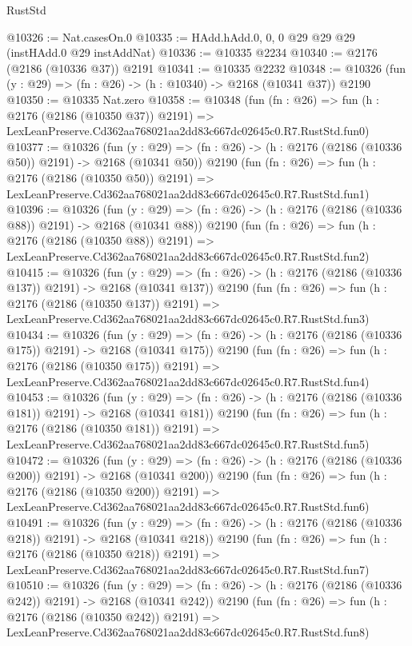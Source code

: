 \begin{lexlean}{RustStd}
\begin{coremodule}
@10326 := Nat.casesOn.{0}
@10335 := HAdd.hAdd.{0, 0, 0} @29 @29 @29 (instHAdd.{0} @29 instAddNat)
@10336 := @10335 @2234
@10340 := @2176 (@2186 (@10336 @37)) @2191
@10341 := @10335 @2232
@10348 := @10326 (fun (y : @29) => (fn : @26) -> (h : @10340) -> @2168 (@10341 @37)) @2190
@10350 := @10335 Nat.zero
@10358 := @10348
    (fun (fn : @26) =>
    fun (h : @2176 (@2186 (@10350 @37)) @2191) =>
    LexLeanPreserve.Cd362aa768021aa2dd83c667dc02645c0.R7.RustStd.fun0)
@10377 := @10326
    (fun (y : @29) => (fn : @26) -> (h : @2176 (@2186 (@10336 @50)) @2191) -> @2168 (@10341 @50))
    @2190
    (fun (fn : @26) =>
    fun (h : @2176 (@2186 (@10350 @50)) @2191) =>
    LexLeanPreserve.Cd362aa768021aa2dd83c667dc02645c0.R7.RustStd.fun1)
@10396 := @10326
    (fun (y : @29) => (fn : @26) -> (h : @2176 (@2186 (@10336 @88)) @2191) -> @2168 (@10341 @88))
    @2190
    (fun (fn : @26) =>
    fun (h : @2176 (@2186 (@10350 @88)) @2191) =>
    LexLeanPreserve.Cd362aa768021aa2dd83c667dc02645c0.R7.RustStd.fun2)
@10415 := @10326
    (fun (y : @29) => (fn : @26) -> (h : @2176 (@2186 (@10336 @137)) @2191) -> @2168 (@10341 @137))
    @2190
    (fun (fn : @26) =>
    fun (h : @2176 (@2186 (@10350 @137)) @2191) =>
    LexLeanPreserve.Cd362aa768021aa2dd83c667dc02645c0.R7.RustStd.fun3)
@10434 := @10326
    (fun (y : @29) => (fn : @26) -> (h : @2176 (@2186 (@10336 @175)) @2191) -> @2168 (@10341 @175))
    @2190
    (fun (fn : @26) =>
    fun (h : @2176 (@2186 (@10350 @175)) @2191) =>
    LexLeanPreserve.Cd362aa768021aa2dd83c667dc02645c0.R7.RustStd.fun4)
@10453 := @10326
    (fun (y : @29) => (fn : @26) -> (h : @2176 (@2186 (@10336 @181)) @2191) -> @2168 (@10341 @181))
    @2190
    (fun (fn : @26) =>
    fun (h : @2176 (@2186 (@10350 @181)) @2191) =>
    LexLeanPreserve.Cd362aa768021aa2dd83c667dc02645c0.R7.RustStd.fun5)
@10472 := @10326
    (fun (y : @29) => (fn : @26) -> (h : @2176 (@2186 (@10336 @200)) @2191) -> @2168 (@10341 @200))
    @2190
    (fun (fn : @26) =>
    fun (h : @2176 (@2186 (@10350 @200)) @2191) =>
    LexLeanPreserve.Cd362aa768021aa2dd83c667dc02645c0.R7.RustStd.fun6)
@10491 := @10326
    (fun (y : @29) => (fn : @26) -> (h : @2176 (@2186 (@10336 @218)) @2191) -> @2168 (@10341 @218))
    @2190
    (fun (fn : @26) =>
    fun (h : @2176 (@2186 (@10350 @218)) @2191) =>
    LexLeanPreserve.Cd362aa768021aa2dd83c667dc02645c0.R7.RustStd.fun7)
@10510 := @10326
    (fun (y : @29) => (fn : @26) -> (h : @2176 (@2186 (@10336 @242)) @2191) -> @2168 (@10341 @242))
    @2190
    (fun (fn : @26) =>
    fun (h : @2176 (@2186 (@10350 @242)) @2191) =>
    LexLeanPreserve.Cd362aa768021aa2dd83c667dc02645c0.R7.RustStd.fun8)

\end{coremodule}
\end{lexlean}
